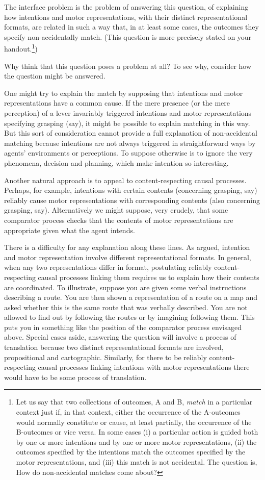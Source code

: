 \documentclass[12pt,\papersize]{extarticle}
\begin{document}
The interface problem is the problem of answering this question, of explaining how intentions and motor representations, with their distinct representational formats, are related in such a way that, in at least some cases, the outcomes they specify non-accidentally match. 
(This question is more precisely stated on your handout.\footnote{Let us say that two collections of outcomes, A and B, \emph{match} in a particular context just if, in that context, either the occurrence of the A-outcomes would normally constitute or cause, at least partially, the occurrence of the B-outcomes or vice versa.
In some cases (i) a particular action is guided both by one or more intentions and by one or more motor representations,
(ii) the outcomes specified by the intentions match the outcomes specified by the motor representations, and
(iii) this match is not accidental. 
The question is, How do non-accidental matches come about?
})

Why think that this question poses a problem at all?  
To see why, consider how the question might be answered.

One might try to explain the match by supposing that intentions and motor representations have a common cause. If the mere presence (or the mere perception) of a lever invariably triggered intentions and motor representations specifying grasping (say), it might be possible to explain matching in this way. But this sort of consideration cannot provide a full explanation of non-accidental matching 
because
intentions are not always triggered in straightforward ways by agents' environments or perceptions.
To suppose otherwise is to ignore the very phenomena, decision and planning, which make intention so interesting.  

Another natural approach is to  appeal to content-respecting causal processes. Perhaps, for example, intentions with certain contents (concerning grasping, say) reliably cause motor representations with corresponding contents (also concerning grasping, say). Alternatively we might suppose, very crudely, that some comparator process checks that the contents of motor representations are appropriate given what the agent intends.  

There is a difficulty for any  explanation along these lines.
As argued,
intention and motor representation involve different representational formats. 
In general, when any two representations differ in format, postulating reliably content-respecting causal processes linking them requires us to explain how their contents are coordinated. 
To illustrate, suppose you are given some verbal instructions describing a route. You are then shown a representation of a route on a map and asked whether this is the same route that was verbally described. You are not allowed to find out by following the routes or by imagining following them. This puts you in something like the position of the comparator process envisaged above. Special cases aside, answering the question will involve a process of translation because two distinct representational formats are involved, propositional and cartographic. 
Similarly, for there to be reliably content-respecting causal processes linking intentions with motor representations there would have to be some process of translation.
\end{document}
